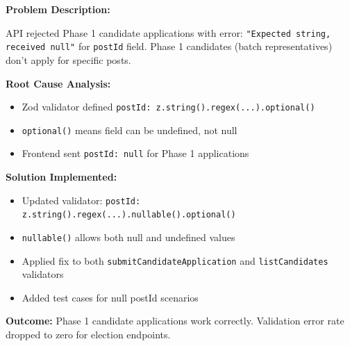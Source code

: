 \documentclass[12pt,a4paper]{article}
\begin{document}
\begin{tcolorbox}[colback=LightTeal, colframe=Teal, title=\textbf{Challenge 7: Zod Validation Schema for Nullable Fields}, fonttitle=\bfseries]

\textbf{Problem Description:}

API rejected Phase 1 candidate applications with error: \texttt{"Expected string, received null"} for \texttt{postId} field. Phase 1 candidates (batch representatives) don't apply for specific posts.

\textbf{Root Cause Analysis:}
\begin{itemize}[noitemsep]
  \item Zod validator defined \texttt{postId: z.string().regex(...).optional()}
  \item \texttt{optional()} means field can be undefined, not null
  \item Frontend sent \texttt{postId: null} for Phase 1 applications
\end{itemize}

\textbf{Solution Implemented:}
\begin{itemize}[noitemsep]
  \item Updated validator: \texttt{postId: z.string().regex(...).nullable().optional()}
  \item \texttt{nullable()} allows both null and undefined values
  \item Applied fix to both \texttt{submitCandidateApplication} and \texttt{listCandidates} validators
  \item Added test cases for null postId scenarios
\end{itemize}

\textbf{Outcome:} Phase 1 candidate applications work correctly. Validation error rate dropped to zero for election endpoints.
\end{tcolorbox}

\vspace{8pt}
\end{document}
